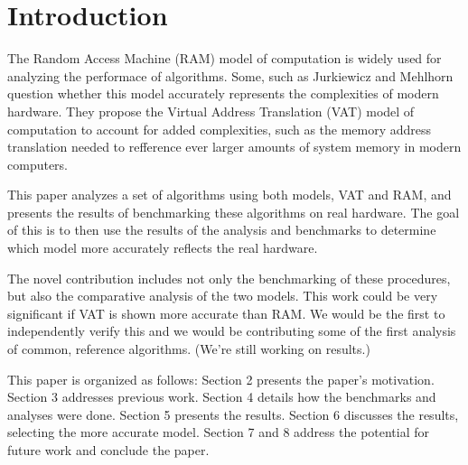 \section{Introduction}
  
  The Random Access Machine (RAM) model of computation is widely used for
  analyzing the performace of algorithms. Some, such as Jurkiewicz and Mehlhorn
  question whether this model accurately represents the complexities of modern
  hardware. They propose the Virtual Address Translation (VAT) model of
  computation to account for added complexities, such as the memory address
  translation needed to refference ever larger amounts of system memory in 
  modern computers.
  
  This paper analyzes a set of algorithms using both models, VAT and RAM,
  and presents the results of benchmarking these algorithms on real hardware.
  The goal of this is to then use the results of the analysis and benchmarks
  to determine which model more accurately reflects the real hardware.
  
  The novel contribution includes not only the benchmarking of these procedures,
  but also the comparative analysis of the two models. This work could be very
  significant if VAT is shown more accurate than RAM. We would be the first to
  independently verify this and we would be contributing some of the first
  analysis of common, reference algorithms. (We're still working on results.)

  This paper is organized as follows: Section 2 presents the paper's
  motivation. Section 3 addresses previous work. Section 4 details how the
  benchmarks and analyses were done. Section 5 presents the results. Section 6
  discusses the results, selecting the more accurate model. Section 7 and 8 
  address the potential for future work and conclude the paper.